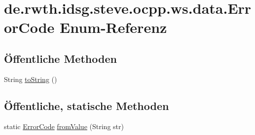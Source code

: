 \hypertarget{enumde_1_1rwth_1_1idsg_1_1steve_1_1ocpp_1_1ws_1_1data_1_1_error_code}{\section{de.\+rwth.\+idsg.\+steve.\+ocpp.\+ws.\+data.\+Error\+Code Enum-\/\+Referenz}
\label{enumde_1_1rwth_1_1idsg_1_1steve_1_1ocpp_1_1ws_1_1data_1_1_error_code}
}
\subsection*{Öffentliche Methoden}
\begin{DoxyCompactItemize}
\item 
String \hyperlink{enumde_1_1rwth_1_1idsg_1_1steve_1_1ocpp_1_1ws_1_1data_1_1_error_code_a36738aa11b27ecc8597edfe006af4dc3}{to\+String} ()
\end{DoxyCompactItemize}
\subsection*{Öffentliche, statische Methoden}
\begin{DoxyCompactItemize}
\item 
static \hyperlink{enumde_1_1rwth_1_1idsg_1_1steve_1_1ocpp_1_1ws_1_1data_1_1_error_code}{Error\+Code} \hyperlink{enumde_1_1rwth_1_1idsg_1_1steve_1_1ocpp_1_1ws_1_1data_1_1_error_code_a1b6b9483c77e5aafe90a205c98ed46fd}{from\+Value} (String str)
\end{DoxyCompactItemize}
